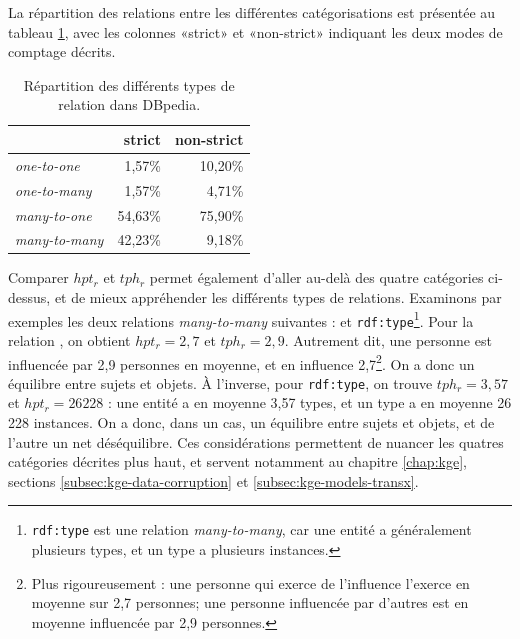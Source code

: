 La répartition des relations entre les différentes catégorisations est présentée au tableau \ref{tab:litt-rel-cardinalities}, avec les colonnes «strict» et «non-strict» indiquant les deux modes de comptage décrits. 


\begin{table}[ht]
    \centering
    \caption{Répartition des différents types de relation dans DBpedia.}
    \begin{tabular}{|l|r|r|}
    \hline
         & strict & non-strict \\ \hline
\textit{one-to-one} & 1,57\% & 10,20\% \\
\textit{one-to-many} & 1,57\% & 4,71\% \\
\textit{many-to-one} & 54,63\% & 75,90\% \\
\textit{many-to-many} & 42,23\% & 9,18\% \\
\hline
    \end{tabular}
    \label{tab:litt-rel-cardinalities}
\end{table}

Comparer $hpt_r$ et $tph_r$ permet également d'aller au-delà des quatre catégories ci-dessus, et de mieux appréhender les différents types de relations. 
Examinons par exemples les deux relations \textit{many-to-many}  suivantes :  et \texttt{rdf:type}\footnote{\texttt{rdf:type} est une relation \textit{many-to-many}, car une entité a généralement plusieurs types, et un type a plusieurs instances.}.
Pour la relation , on obtient $hpt_r = 2,7$ et $tph_r=2,9$. Autrement dit, une personne est influencée par 2,9 personnes en moyenne, et en influence 2,7\footnote{Plus rigoureusement : une personne qui exerce de l'influence l'exerce en moyenne sur 2,7 personnes; une personne influencée par d'autres est en moyenne influencée par 2,9 personnes.}. On a donc un équilibre entre sujets et objets.
À l'inverse, pour \texttt{rdf:type}, on trouve $tph_r = 3,57$ et $hpt_r = 26 228$ : une entité a en moyenne 3,57 types, et un type a en moyenne 26 228 instances.  
On a donc, dans un cas, un équilibre entre sujets et objets, et de l'autre un net déséquilibre. 
Ces considérations permettent de nuancer les quatres catégories décrites plus haut, et servent notamment au chapitre \ref{chap:kge}, sections \ref{subsec:kge-data-corruption} et \ref{subsec:kge-models-transx}.


